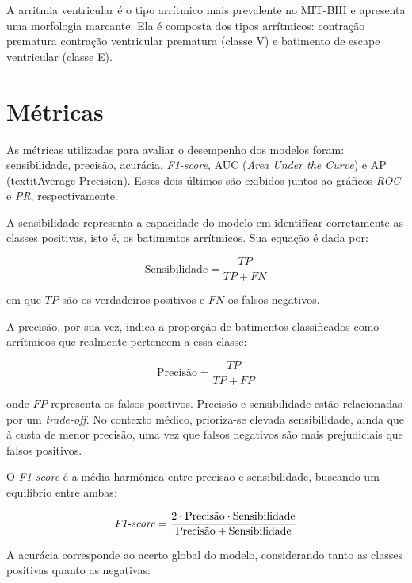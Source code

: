 A arritmia ventricular é o tipo arrítmico mais prevalente no MIT-BIH e apresenta uma morfologia marcante. Ela é composta dos tipos arrítmicos: contração prematura
contração ventricular prematura (classe V) e batimento de escape ventricular (classe E).


\section{Métricas}
\label{sec:metricas}

As métricas utilizadas para avaliar o desempenho dos modelos foram: sensibilidade, precisão, acurácia, \textit{F1-score}, AUC (\textit{Area Under the Curve}) e AP (textit{Average Precision}). Esses 
dois últimos são exibidos juntos ao gráficos \textit{ROC} e \textit{PR}, respectivamente.

A sensibilidade representa a capacidade do modelo em identificar corretamente as classes positivas, isto é, os batimentos arrítmicos. Sua equação é dada por:

\begin{equation}
\text{Sensibilidade} = \frac{TP}{TP + FN}
\end{equation}

em que $TP$ são os verdadeiros positivos e $FN$ os falsos negativos.  

A precisão, por sua vez, indica a proporção de batimentos classificados como arrítmicos que realmente pertencem a essa classe:

\begin{equation}
\text{Precisão} = \frac{TP}{TP + FP}
\end{equation}

onde $FP$ representa os falsos positivos. Precisão e sensibilidade estão relacionadas por um \textit{trade-off}. No contexto médico, prioriza-se elevada sensibilidade, ainda que à custa de menor precisão, uma vez que falsos negativos são mais prejudiciais que falsos positivos.  

O \textit{F1-score} é a média harmônica entre precisão e sensibilidade, buscando um equilíbrio entre ambas:

\begin{equation}
\text{\textit{F1-score}} = \frac{2 \cdot \text{Precisão} \cdot \text{Sensibilidade}}{\text{Precisão} + \text{Sensibilidade}}
\end{equation}

A acurácia corresponde ao acerto global do modelo, considerando tanto as classes positivas quanto as negativas:

